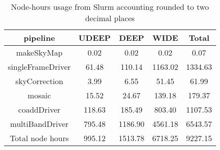 \begin{table}
\centering
\begin{tabular} {|c|c|c|c|c|}
\hline
pipeline & UDEEP & DEEP & WIDE & Total\\
\hline
makeSkyMap&0.02& 0.02& 0.02& 0.07\\
singleFrameDriver&61.48& 110.14& 1163.02& 1334.63\\
skyCorrection&3.99& 6.55& 51.45& 61.99\\
mosaic&15.52& 24.67& 139.18& 179.37\\
coaddDriver&118.63& 185.49& 803.40& 1107.53\\
multiBandDriver&795.48& 1186.90& 4561.18&6543.57\\
\hline
Total node hours&995.12&1513.78&6718.25&9227.15\\
\hline
\end{tabular}
\caption{Node-hours usage from Slurm accounting rounded to two decimal places}
\label{table2}
\end{table}
